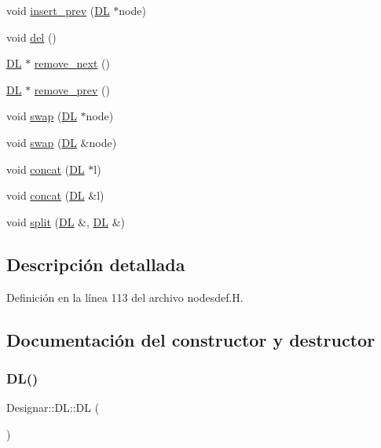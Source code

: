\begin{DoxyCompactItemize}
\item 
void \hyperlink{class_designar_1_1_d_l_a44a3c60cd0f8de9811936cbe78d2e85e}{insert\+\_\+prev} (\hyperlink{class_designar_1_1_d_l}{DL} $\ast$node)
\item 
void \hyperlink{class_designar_1_1_d_l_affc0a48f00bd2ff8a6899c2a0c3d0ae3}{del} ()
\item 
\hyperlink{class_designar_1_1_d_l}{DL} $\ast$ \hyperlink{class_designar_1_1_d_l_a005d23127d2743fec552cafce79095d4}{remove\+\_\+next} ()
\item 
\hyperlink{class_designar_1_1_d_l}{DL} $\ast$ \hyperlink{class_designar_1_1_d_l_ab1978cfd1b4a98bedb0da473a7ba3164}{remove\+\_\+prev} ()
\item 
void \hyperlink{class_designar_1_1_d_l_a3a6b3f9fe3da01008ebf5f60bdf20bbc}{swap} (\hyperlink{class_designar_1_1_d_l}{DL} $\ast$node)
\item 
void \hyperlink{class_designar_1_1_d_l_a7b32539230a7ce8c23a8439bac4f3a12}{swap} (\hyperlink{class_designar_1_1_d_l}{DL} \&node)
\item 
void \hyperlink{class_designar_1_1_d_l_a016ee38fa1d6a467f07b3c8838e14937}{concat} (\hyperlink{class_designar_1_1_d_l}{DL} $\ast$l)
\item 
void \hyperlink{class_designar_1_1_d_l_ad952d602d2beded2a8f922289fe16d7f}{concat} (\hyperlink{class_designar_1_1_d_l}{DL} \&l)
\item 
void \hyperlink{class_designar_1_1_d_l_a81ed81ffd61fde1419fb4fb87ba551e3}{split} (\hyperlink{class_designar_1_1_d_l}{DL} \&, \hyperlink{class_designar_1_1_d_l}{DL} \&)
\end{DoxyCompactItemize}


\subsection{Descripción detallada}


Definición en la línea 113 del archivo nodesdef.\+H.



\subsection{Documentación del constructor y destructor}
\mbox{\label{class_designar_1_1_d_l_a1e17a6036b4e5325d5aeb6641074ee14}} 
\subsubsection{\texorpdfstring{D\+L()}{DL()}\hspace{0.1cm}{\footnotesize\ttfamily [1/3]}}
{\footnotesize\ttfamily Designar\+::\+D\+L\+::\+DL (\begin{DoxyParamCaption}{ }\end{DoxyParamCaption})\hspace{0.3cm}{\ttfamily [inline]}}



